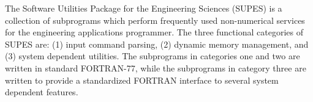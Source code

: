 The Software Utilities Package for the Engineering Sciences (SUPES) is a
collection of subprograms which perform frequently used non-numerical
services for the engineering applications programmer.  The three functional
categories of SUPES are: (1) input command parsing, (2) dynamic memory
management, and (3) system dependent utilities.  The subprograms in categories
one and two are written in standard FORTRAN-77, while the subprograms in
category three are written to provide a standardized FORTRAN interface to
several system dependent features.
